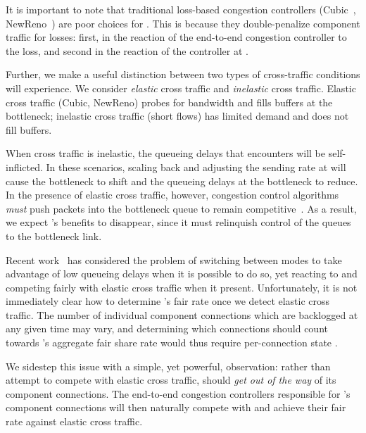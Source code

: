 It is important to note that traditional loss-based congestion controllers (\ie Cubic~\cite{cubic}, NewReno~\cite{newreno}) are poor choices for \name. 
This is because they double-penalize component traffic for losses: first, in the reaction of the end-to-end congestion controller to the loss, and second in the reaction of the controller at \name.

%
Further, we make a useful distinction between two types of cross-traffic conditions \name will experience.
We consider \emph{elastic} cross traffic and \emph{inelastic} cross traffic.
Elastic cross traffic (\eg Cubic, NewReno) probes for bandwidth and fills buffers at the bottleneck; inelastic cross traffic (\eg short flows) has limited demand and does not fill buffers.

When cross traffic is inelastic, the queueing delays that \name encounters will be self-inflicted. In these scenarios, scaling back and adjusting the sending rate at \inbox will cause the bottleneck to shift and the queueing delays at the bottleneck to reduce.
In the presence of elastic cross traffic, however, congestion control algorithms \emph{must} push packets into the bottleneck queue to remain competitive~\cite{bbr, copa, nimbus}.
As a result, we expect \name's benefits to disappear, since it must relinquish control of the queues to the bottleneck link.


Recent work~\cite{copa, nimbus} has considered the problem of switching between modes to take advantage of low queueing delays when it is possible to do so, yet reacting to and competing fairly with elastic cross traffic when it present.
Unfortunately, it is not immediately clear how to determine \name's fair rate once we detect elastic cross traffic.
The number of individual component connections which are backlogged at any given time may vary, and determining which connections should count towards \name's aggregate fair share rate would thus require per-connection state .

We sidestep this issue with a simple, yet powerful, observation: rather than attempt to compete with elastic cross traffic, \name should \emph{get out of the way} of its component connections.
The end-to-end congestion controllers responsible for \name's component connections will then naturally compete with and achieve their fair rate against elastic cross traffic.

